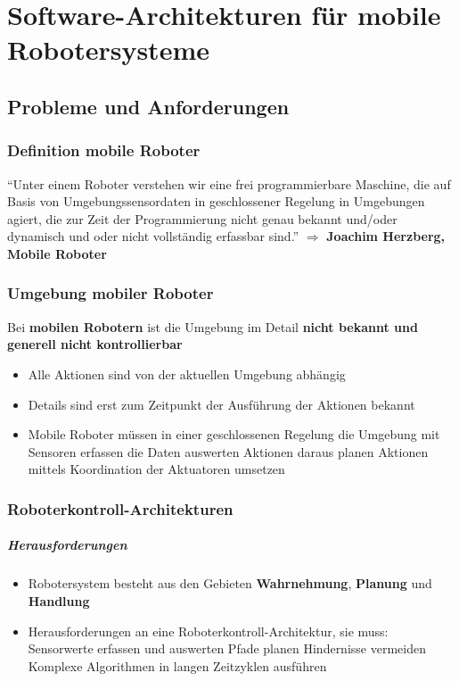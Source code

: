 \chapter{Software-Architekturen für mobile Robotersysteme}
\section{Probleme und Anforderungen}
\subsection{Definition mobile Roboter}
\enquote{Unter einem Roboter verstehen wir eine frei programmierbare Maschine, die auf Basis von Umgebungssensordaten in geschlossener Regelung in Umgebungen agiert, die zur Zeit der Programmierung nicht genau bekannt und/oder dynamisch und oder nicht vollständig erfassbar sind.}
$\Rightarrow$ \textbf{Joachim Herzberg, Mobile Roboter}
\subsection{Umgebung mobiler Roboter}
Bei \textbf{mobilen Robotern} ist die Umgebung im Detail \textbf{nicht bekannt und generell nicht kontrollierbar}
\begin{itemize}
	\item Alle Aktionen sind von der aktuellen Umgebung abhängig
	\item Details sind erst zum Zeitpunkt der Ausführung der Aktionen bekannt
	\item Mobile Roboter müssen in einer geschlossenen Regelung
		\subitem die Umgebung mit Sensoren erfassen
		\subitem die Daten auswerten
		\subitem Aktionen daraus planen
		\subitem Aktionen mittels Koordination der Aktuatoren umsetzen
\end{itemize}
\subsection{Roboterkontroll-Architekturen}
\paragraph{Herausforderungen}
\begin{itemize}
	\item Robotersystem besteht aus den Gebieten \textbf{Wahrnehmung}, \textbf{Planung} und \textbf{Handlung}
	\item Herausforderungen an eine Roboterkontroll-Architektur, sie muss:
	\subitem Sensorwerte erfassen und auswerten
	\subitem Pfade planen
	\subitem Hindernisse vermeiden
	\subitem Komplexe Algorithmen in langen Zeitzyklen ausführen
\end{itemize}
